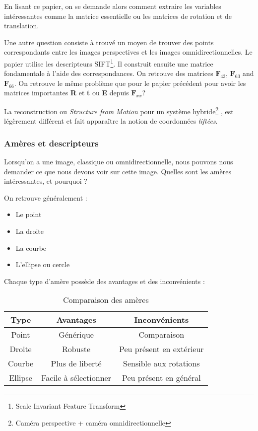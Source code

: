 En lisant ce papier, on se demande alors comment extraire les variables intéressantes comme la matrice essentielle ou les matrices de rotation et de translation.

Une autre question consiste à trouvé un moyen de trouver des points correspondants entre les images perspectives et les images omnidirectionnelles.
Le papier \cite{Puig08} utilise les descripteurs SIFT\footnote{Scale Invariant Feature Transform}.
Il construit ensuite une matrice fondamentale à l'aide des correspondances.
On retrouve des matrices $\mathbf{F}_{43}$, $\mathbf{F}_{63}$ and $\mathbf{F}_{66}$.
On retrouve le même problème que pour le papier précédent pour avoir les matrices importantes \textbf{R} et \textbf{t} ou \textbf{E} depuis $\mathbf{F}_{xx}$?

 
  La reconstruction ou \emph{Structure from Motion} pour un système hybride\footnote{Caméra perspective + caméra omnidirectionnelle} \cite{Bastanlar09PhD}, est légèrement différent et fait apparaître la notion de coordonnées \emph{liftées}.

\subsubsection{Amères et descripteurs}

Lorsqu'on a une image, classique ou omnidirectionnelle, nous pouvons nous demander ce que nous devons voir sur cette image.
Quelles sont les amères intéressantes, et pourquoi ?

On retrouve généralement :
\begin{itemize}
\item Le point
\item La droite
\item La courbe
\item L'ellipse ou cercle
\end{itemize}
Chaque type d'amère possède des avantages et des inconvénients :
\begin{table}[h]
  \begin{center}
    \begin{tabular}{|c|c|c|}
      \hline
      Type & Avantages & Inconvénients \\
      \hline
      Point & Générique & Comparaison \\
      Droite & Robuste & Peu présent en extérieur \\
      Courbe & Plus de liberté & Sensible aux rotations \\
      Ellipse & Facile à sélectionner & Peu présent en général\\
      \hline
    \end{tabular}    		
  \end{center}
  \caption{Comparaison des amères}
\end{table}


